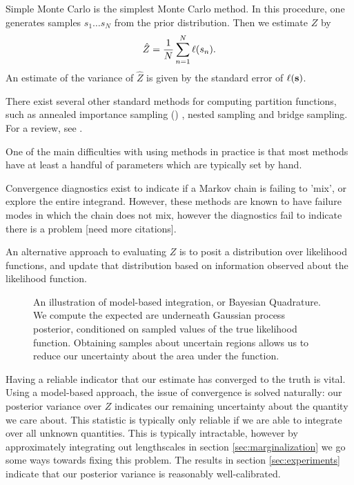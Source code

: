 \documentclass{article}
\begin{document}

Simple Monte Carlo is the simplest Monte Carlo method.  In this procedure, one generates samples $s_1 \dots s_N$ from the prior distribution.  Then we estimate $Z$ by $$\hat{Z} = \frac{1}{N} \sum_{n=1}^{N} \lfn(s_n).$$  An estimate of the variance of $\hat{Z}$ is given by the standard error of $\lfn({\bf s})$.


There exist several other standard methods for computing partition functions, such as annealed importance sampling () \citep{neal2001annealed}, nested sampling \citep{skilling2004nested} and bridge sampling.  For a review, see \citet{chen2000monte}.

One of the main difficulties with using  methods in practice is that most methods have at least a handful of parameters which are typically set by hand.

Convergence diagnostics exist to indicate if a Markov chain is failing to 'mix', or explore the entire integrand.  However, these methods are known to have failure modes in which the chain does not mix, however the diagnostics fail to indicate there is a problem \citep{NealMC} [need more citations].

An alternative approach to evaluating $Z$ is to posit a distribution over likelihood functions, and update that distribution based on information observed about the likelihood function.

 \begin{figure}
 \centering
 \caption{An illustration of model-based integration, or Bayesian Quadrature.  We compute the expected are underneath Gaussian process posterior, conditioned on sampled values of the true likelihood function.  Obtaining samples about uncertain regions allows us to reduce our uncertainty about the area under the function.  }
 \label{fig:model_based}
 \end{figure}

Having a reliable indicator that our estimate has converged to the truth is vital.  Using a model-based approach, the issue of convergence is solved naturally:  our posterior variance over $Z$ indicates our remaining uncertainty about the quantity we care about.  This statistic is typically only reliable if we are able to integrate over all unknown quantities.  This is typically intractable, however by approximately integrating out lengthscales in section \ref{sec:marginalization} we go some ways towards fixing this problem.  The results in section \ref{sec:experiments} indicate that our posterior variance is reasonably well-calibrated.
\end{document}
